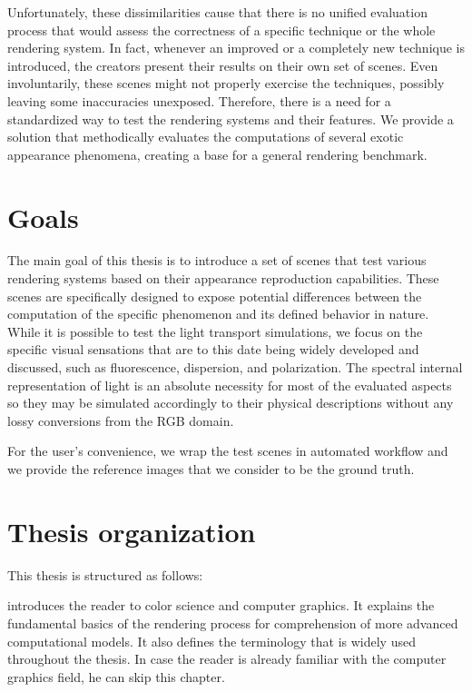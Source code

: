 Unfortunately, these dissimilarities cause that there is no unified evaluation process that would assess the correctness of a specific technique or the whole rendering system. In fact, whenever an improved or a completely new technique is introduced, the creators present their results on their own set of scenes. Even involuntarily, these scenes might not properly exercise the techniques, possibly leaving some inaccuracies unexposed. Therefore, there is a need for a standardized way to test the rendering systems and their features. We provide a solution that methodically evaluates the computations of several exotic appearance phenomena, creating a base for a general rendering benchmark.

\section*{Goals}

The main goal of this thesis is to introduce a set of scenes that test various rendering systems based on their appearance reproduction capabilities. These scenes are specifically designed to expose potential differences between the computation of the specific phenomenon and its defined behavior in nature. While it is possible to test the light transport simulations, we focus on the specific visual sensations that are to this date being widely developed and discussed, such as fluorescence, dispersion, and polarization. The spectral internal representation of light is an absolute necessity for most of the evaluated aspects so they may be simulated accordingly to their physical descriptions without any lossy conversions from the RGB domain.

For the user's convenience, we wrap the test scenes in automated workflow and we provide the reference images that we consider to be the ground truth.

\section*{Thesis organization}

This thesis is structured as follows: 

 introduces the reader to color science and computer graphics. It explains the fundamental basics of the rendering process for comprehension of more advanced computational models. It also defines the terminology that is widely used throughout the thesis. In case the reader is already familiar with the computer graphics field, he can skip this chapter. 

